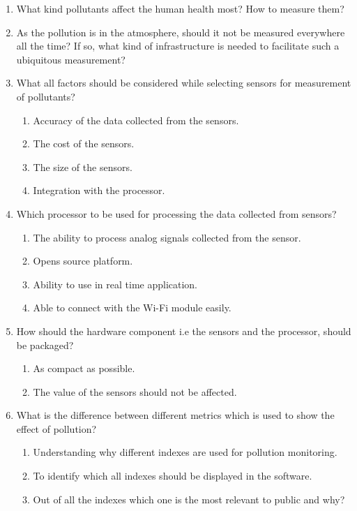  \begin{enumerate}
  \item What kind pollutants affect the human health most? How to measure them?
   
  \item  As the pollution is in the atmosphere, should it not be measured everywhere all the time? If so, what kind of infrastructure is needed to facilitate such a ubiquitous measurement?
  
 \item What all factors should be considered while selecting sensors for measurement of pollutants?
 
 \begin{enumerate}
 \item Accuracy of the data collected from the sensors.
 \item The cost of the sensors.
 \item The size of the sensors.
 \item Integration with the processor.
 \end{enumerate}

 \item Which processor to be used for processing the data collected from sensors?
 
 \begin{enumerate}
 \item The ability to process analog signals collected from the sensor.
 \item Opens source platform.
 \item Ability to use in real time application.
 \item Able to connect with the Wi-Fi module easily.
 \end{enumerate}

 \item How should the hardware component i.e the sensors and the processor, should be packaged?
 
 \begin{enumerate}
\item As compact as possible.
\item The value of the sensors should not be affected.  
 \end{enumerate}
 
 
   \item What is the difference between different metrics which is used to show       	the effect of pollution?
   \begin{enumerate}
   \item Understanding why different indexes are used for pollution monitoring.
   \item To identify which all indexes should be displayed in the software.
   \item Out of all the indexes which one is the most relevant to public and why?
  

\end{enumerate}
\end{enumerate}
